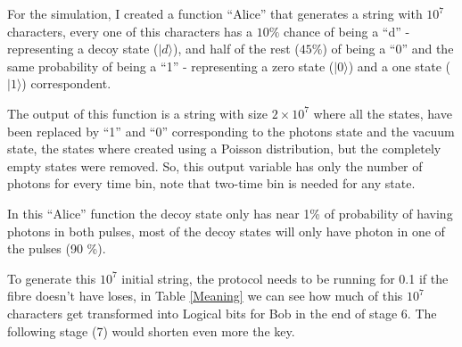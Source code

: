 \begin{refsection}
For the simulation, I created a function ``Alice'' that generates a string with $10^7$ characters, every one of this characters has a $10 \%$ chance of being a ``d'' - representing a decoy state ($|d\rangle$), and half of the rest ($45 \%$) of being a ``0'' and the same probability of being a ``1'' - representing a zero state ($|0\rangle$) and a one state ($|1\rangle$) correspondent.

The output of this function is a string with size $2\times10^7$ where all the states, have been replaced by ``1'' and ``0'' corresponding to the photons state and the vacuum state, the states where created using a Poisson distribution, but the completely empty states were removed. So, this output variable has only the number of photons for every time bin, note that two-time bin is needed for any state.

In this ``Alice'' function the decoy state only has near 1\% of probability of having photons in both pulses, most of the decoy states will only have photon in one of the pulses (90 \%).

To generate this $10^7$ initial string, the protocol needs to be running for 0.1 if the fibre doesn't have loses, in Table \ref{Meaning} we can see how much of this $10^7$ characters get transformed into Logical bits for Bob in the end of stage 6. The following stage (7) would shorten even more the key.



\end{refsection}
